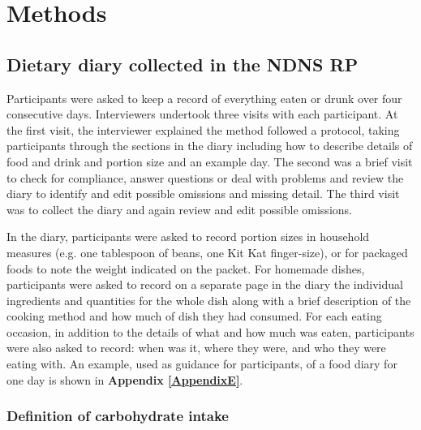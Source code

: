 
\chapter{Methods} %

\label{Chapter 2} %


\section{Dietary diary collected in the NDNS RP}\vspace{-0.3cm}

Participants were asked to keep a record of everything eaten or drunk over four consecutive days. Interviewers undertook three visits with each participant. At the first visit, the interviewer explained the method followed a protocol, taking participants through the sections in the diary including how to describe details of food and drink and portion size and an example day. The second was a brief visit to check for compliance, answer questions or deal with problems and review the diary to identify and edit possible omissions and missing detail. The third visit was to collect the diary and again review and edit possible omissions. 

In the diary, participants were asked to record portion sizes in household measures (e.g. one tablespoon of beans, one Kit Kat finger-size), or for packaged foods to note the weight indicated on the packet. For homemade dishes, participants were asked to record on a separate page in the diary the individual ingredients and quantities for the whole dish along with a brief description of the cooking method and how much of dish they had consumed. For each eating occasion, in addition to the details of what and how much was eaten, participants were also asked to record: when was it, where they were, and who they were eating with. An example, used as guidance for participants, of a food diary for one day is shown in \textbf{Appendix \ref{AppendixE}}.\vspace{-0.3cm}

\subsection{Definition of carbohydrate intake}\vspace{-0.3cm}

